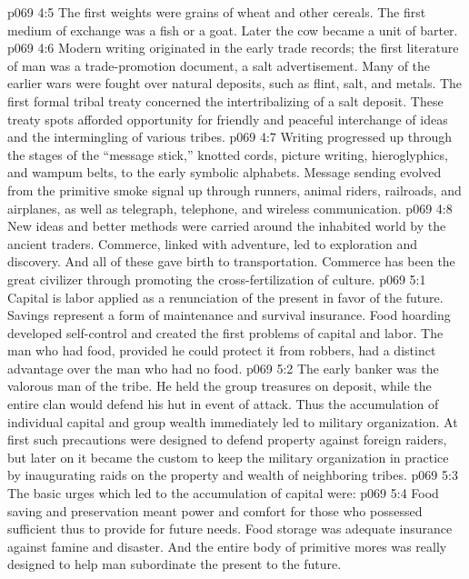 \pc \vs p069 4:5 The first weights were grains of wheat and other cereals. The first medium of exchange was a fish or a goat. Later the cow became a unit of barter.
\vs p069 4:6 Modern writing originated in the early trade records; the first literature of man was a trade\hyp{}promotion document, a salt advertisement. Many of the earlier wars were fought over natural deposits, such as flint, salt, and metals. The first formal tribal treaty concerned the intertribalizing of a salt deposit. These treaty spots afforded opportunity for friendly and peaceful interchange of ideas and the intermingling of various tribes.
\vs p069 4:7 Writing progressed up through the stages of the “message stick,” knotted cords, picture writing, hieroglyphics, and wampum belts, to the early symbolic alphabets. Message sending evolved from the primitive smoke signal up through runners, animal riders, railroads, and airplanes, as well as telegraph, telephone, and wireless communication.
\vs p069 4:8 New ideas and better methods were carried around the inhabited world by the ancient traders. Commerce, linked with adventure, led to exploration and discovery. And all of these gave birth to transportation. Commerce has been the great civilizer through promoting the cross\hyp{}fertilization of culture.
\vs p069 5:1 Capital is labor applied as a renunciation of the present in favor of the future. Savings represent a form of maintenance and survival insurance. Food hoarding developed self\hyp{}control and created the first problems of capital and labor. The man who had food, provided he could protect it from robbers, had a distinct advantage over the man who had no food.
\vs p069 5:2 The early banker was the valorous man of the tribe. He held the group treasures on deposit, while the entire clan would defend his hut in event of attack. Thus the accumulation of individual capital and group wealth immediately led to military organization. At first such precautions were designed to defend property against foreign raiders, but later on it became the custom to keep the military organization in practice by inaugurating raids on the property and wealth of neighboring tribes.\plusone
\vs p069 5:3 The basic urges which led to the accumulation of capital were:
\pc \vs p069 5:4 \bibnobreakspace {} Food saving and preservation meant power and comfort for those who possessed sufficient  thus to provide for future needs. Food storage was adequate insurance against famine and disaster. And the entire body of primitive mores was really designed to help man subordinate the present to the future.
